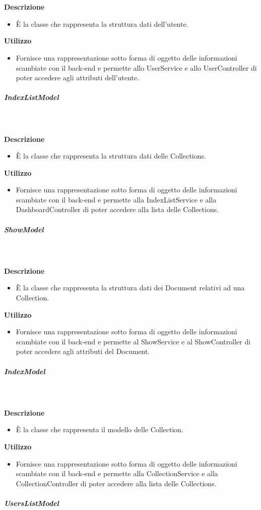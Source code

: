 				\textbf{\\ \\ Descrizione} 
					\begin{itemize}
						\item[] È la classe che rappresenta la struttura dati dell'utente.
					\end{itemize}      
				\textbf{Utilizzo}  
					\begin{itemize}
						\item[] Fornisce una rappresentazione sotto forma di oggetto delle informazioni scambiate con il back-end e permette allo UserService e allo UserController di poter accedere agli attributi dell'utente.
					\end{itemize}
			\subparagraph{IndexListModel}
				
				\textbf{\\ \\ Descrizione} 
					\begin{itemize}
						\item[] È la classe che rappresenta la struttura dati delle Collections.
					\end{itemize}      
				\textbf{Utilizzo}  
					\begin{itemize}
						\item[] Fornisce una rappresentazione sotto forma di oggetto delle informazioni scambiate con il back-end e permette alla IndexListService e alla DashboardController di poter accedere alla lista delle Collections.
					\end{itemize}
			\subparagraph{ShowModel}
				
				\textbf{\\ \\ Descrizione} 
					\begin{itemize}
						\item[] È la classe che rappresenta la struttura dati dei Document relativi ad una Collection.
					\end{itemize}      
				\textbf{Utilizzo}  
					\begin{itemize}
						\item[] Fornisce una rappresentazione sotto forma di oggetto delle informazioni scambiate con il back-end e permette al ShowService e al ShowController di poter accedere agli attributi del Document.
					\end{itemize}
			\subparagraph{IndexModel}
				
				\textbf{\\ \\ Descrizione} 
					\begin{itemize}
						\item[] È la classe che rappresenta il modello delle Collection.
					\end{itemize}      
				\textbf{Utilizzo}  
					\begin{itemize}
						\item[] Fornisce una rappresentazione sotto forma di oggetto delle informazioni scambiate con il back-end e permette alla CollectionService e alla CollectionController di poter accedere alla lista delle Collections.
					\end{itemize}
			\subparagraph{UsersListModel}
				

